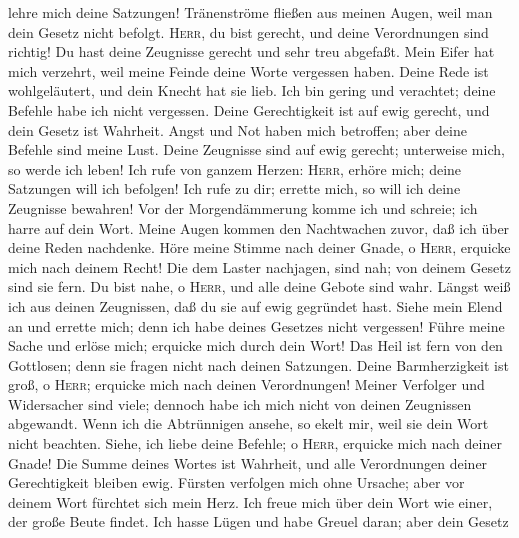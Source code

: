 lehre mich deine Satzungen!  Tränenströme fließen aus
meinen Augen, weil man dein Gesetz nicht befolgt. 
\textsc{Herr}, du bist gerecht, und deine Verordnungen sind richtig!
 Du hast deine Zeugnisse gerecht und sehr treu abgefaßt.
 Mein Eifer hat mich verzehrt, weil meine Feinde deine
Worte vergessen haben.  Deine Rede ist wohlgeläutert,
und dein Knecht hat sie lieb.  Ich bin gering und
verachtet; deine Befehle habe ich nicht vergessen. 
Deine Gerechtigkeit ist auf ewig gerecht, und dein Gesetz ist Wahrheit.
 Angst und Not haben mich betroffen; aber deine Befehle
sind meine Lust.  Deine Zeugnisse sind auf ewig gerecht;
unterweise mich, so werde ich leben!  Ich rufe von
ganzem Herzen: \textsc{Herr}, erhöre mich; deine Satzungen will ich
befolgen!  Ich rufe zu dir; errette mich, so will ich
deine Zeugnisse bewahren!  Vor der Morgendämmerung komme
ich und schreie; ich harre auf dein Wort.  Meine Augen
kommen den Nachtwachen zuvor, daß ich über deine Reden nachdenke.
 Höre meine Stimme nach deiner Gnade, o \textsc{Herr},
erquicke mich nach deinem Recht!  Die dem Laster
nachjagen, sind nah; von deinem Gesetz sind sie fern. 
Du bist nahe, o \textsc{Herr}, und alle deine Gebote sind wahr.
 Längst weiß ich aus deinen Zeugnissen, daß du sie auf
ewig gegründet hast.  Siehe mein Elend an und errette
mich; denn ich habe deines Gesetzes nicht vergessen! 
Führe meine Sache und erlöse mich; erquicke mich durch dein Wort!
 Das Heil ist fern von den Gottlosen; denn sie fragen
nicht nach deinen Satzungen.  Deine Barmherzigkeit ist
groß, o \textsc{Herr}; erquicke mich nach deinen Verordnungen!
 Meiner Verfolger und Widersacher sind viele; dennoch
habe ich mich nicht von deinen Zeugnissen abgewandt. 
Wenn ich die Abtrünnigen ansehe, so ekelt mir, weil sie dein Wort nicht
beachten.  Siehe, ich liebe deine Befehle; o
\textsc{Herr}, erquicke mich nach deiner Gnade!  Die
Summe deines Wortes ist Wahrheit, und alle Verordnungen deiner
Gerechtigkeit bleiben ewig.  Fürsten verfolgen mich ohne
Ursache; aber vor deinem Wort fürchtet sich mein Herz. 
Ich freue mich über dein Wort wie einer, der große Beute findet.
 Ich hasse Lügen und habe Greuel daran; aber dein Gesetz
